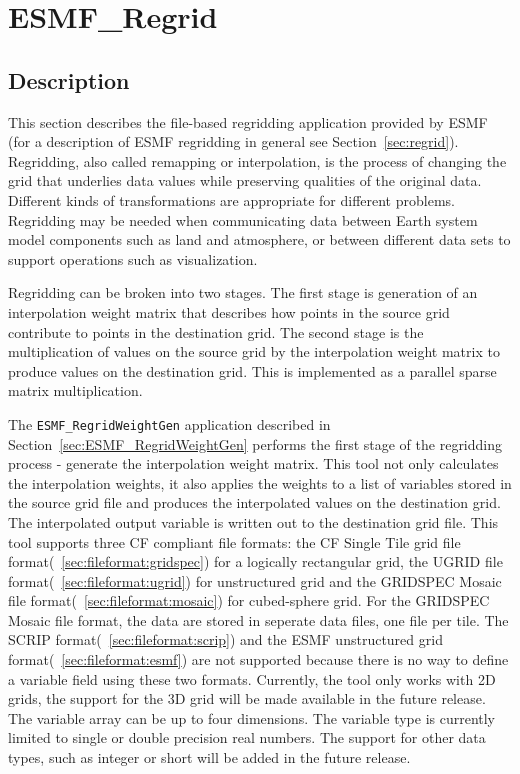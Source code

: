 
\section{ESMF\_Regrid}
\label{sec:ESMF_Regrid}

\subsection{Description}

This section describes the file-based regridding application provided by ESMF (for a description of ESMF regridding in general see Section~\ref{sec:regrid}). Regridding, also called remapping or interpolation, is the process of changing the grid that underlies data values while preserving qualities of the original data. Different kinds of transformations are appropriate for different problems. Regridding may be needed when communicating data between Earth system model components such as land and atmosphere, or between different data sets to support operations such as visualization. 

Regridding can be broken into two stages. The first stage is generation of an interpolation weight matrix that describes how points in
the source grid contribute to points in the destination grid. The second stage is the multiplication of values on the source grid by the
interpolation weight matrix to produce values on the destination grid. This is implemented as a parallel sparse matrix multiplication.

The {\tt ESMF\_RegridWeightGen} application described in Section~\ref{sec:ESMF_RegridWeightGen} 
performs the first stage of the regridding process - generate the interpolation weight matrix. 
This tool not only calculates the interpolation weights, it also applies the
weights to a list of variables 
stored in the source grid file and produces the interpolated values on the destination grid. 
The interpolated output variable is written out to the destination grid file.  This tool 
supports three CF compliant file formats: the CF Single Tile grid file format(~\ref{sec:fileformat:gridspec}) for
a logically rectangular grid, the UGRID file
format(~\ref{sec:fileformat:ugrid}) for unstructured grid and the GRIDSPEC
Mosaic file format(~\ref{sec:fileformat:mosaic}) for cubed-sphere grid.  For
the GRIDSPEC Mosaic file format, the data are stored in seperate data files,
one file per tile.   
The SCRIP format(~\ref{sec:fileformat:scrip}) and the ESMF unstructured grid format(~\ref{sec:fileformat:esmf}) are not supported because there is no way to define a variable field using these two formats. Currently, the tool only works with 2D grids, the support for the 3D grid will be 
made available in the future release.  The variable array can be up to four dimensions.  The
variable type is currently limited to single or double precision real numbers.  The support for 
other data types, such as integer or short will be added in the future release.  

